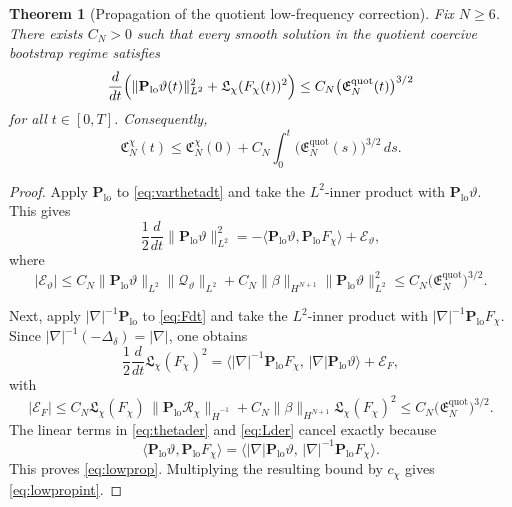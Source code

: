 \documentclass[11pt]{article}
\newtheorem{theorem}{Theorem}
\begin{document}
\begin{theorem}[Propagation of the quotient low-frequency correction]
\label{thm:lowprop}
Fix \(N\ge 6\). There exists \(C_N>0\) such that every smooth solution in the quotient coercive bootstrap regime satisfies
\begin{equation}
\frac{d}{dt}
\Bigl(
\|\mathbf P_{\mathrm{lo}}\vartheta(t)\|_{L^2}^2
+\mathfrak L_\chi(F_\chi(t))^2
\Bigr)
\le
C_N\bigl(\mathfrak E_N^{\mathrm{quot}}(t)\bigr)^{3/2}
\label{eq:lowprop}
\end{equation}
for all \(t\in[0,T]\). Consequently,
\begin{equation}
\mathfrak C_N^\chi(t)
\le
\mathfrak C_N^\chi(0)
+C_N\int_0^t
\bigl(\mathfrak E_N^{\mathrm{quot}}(s)\bigr)^{3/2}\,ds.
\label{eq:lowpropint}
\end{equation}
\end{theorem}

\begin{proof}
Apply \(\mathbf P_{\mathrm{lo}}\) to \eqref{eq:varthetadt} and take the \(L^2\)-inner product with \(\mathbf P_{\mathrm{lo}}\vartheta\). This gives
\begin{equation}
\frac12\frac{d}{dt}\|\mathbf P_{\mathrm{lo}}\vartheta\|_{L^2}^2
=
-\langle \mathbf P_{\mathrm{lo}}\vartheta,\mathbf P_{\mathrm{lo}}F_\chi\rangle
+\mathcal E_\vartheta,
\label{eq:thetader}
\end{equation}
where
\[
|\mathcal E_\vartheta|
\le
C_N\|\mathbf P_{\mathrm{lo}}\vartheta\|_{L^2}\|\mathcal Q_\vartheta\|_{L^2}
+C_N\|\beta\|_{H^{N+1}}\|\mathbf P_{\mathrm{lo}}\vartheta\|_{L^2}^2
\le
C_N\bigl(\mathfrak E_N^{\mathrm{quot}}\bigr)^{3/2}.
\]

Next, apply \(|\nabla|^{-1}\mathbf P_{\mathrm{lo}}\) to \eqref{eq:Fdt} and take the \(L^2\)-inner product with \(|\nabla|^{-1}\mathbf P_{\mathrm{lo}}F_\chi\). Since \(|\nabla|^{-1}(-\Delta_\delta)=|\nabla|\), one obtains
\begin{equation}
\frac12\frac{d}{dt}\mathfrak L_\chi(F_\chi)^2
=
\langle |\nabla|^{-1}\mathbf P_{\mathrm{lo}}F_\chi,\,
|\nabla|\mathbf P_{\mathrm{lo}}\vartheta\rangle
+\mathcal E_F,
\label{eq:Lder}
\end{equation}
with
\[
|\mathcal E_F|
\le
C_N\mathfrak L_\chi(F_\chi)\,
\|\mathbf P_{\mathrm{lo}}\mathcal R_\chi\|_{\dot H^{-1}}
+C_N\|\beta\|_{H^{N+1}}\mathfrak L_\chi(F_\chi)^2
\le
C_N\bigl(\mathfrak E_N^{\mathrm{quot}}\bigr)^{3/2}.
\]
The linear terms in \eqref{eq:thetader} and \eqref{eq:Lder} cancel exactly because
\[
\langle \mathbf P_{\mathrm{lo}}\vartheta,\mathbf P_{\mathrm{lo}}F_\chi\rangle
=
\langle |\nabla|\mathbf P_{\mathrm{lo}}\vartheta,\,
|\nabla|^{-1}\mathbf P_{\mathrm{lo}}F_\chi\rangle.
\]
This proves \eqref{eq:lowprop}. Multiplying the resulting bound by \(c_\chi\) gives \eqref{eq:lowpropint}.
\end{proof}
\end{document}
